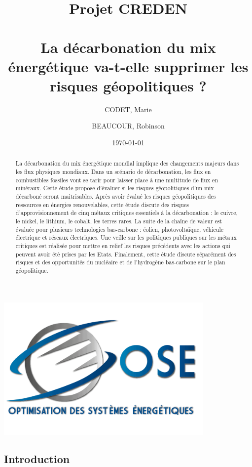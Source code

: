 \documentclass{article}
\title{\centering\huge Projet CREDEN \\~\\ \Large La décarbonation du mix énergétique va-t-elle supprimer les risques géopolitiques ?}
\author{
  CODET, Marie\\
  \and
  BEAUCOUR, Robinson\\
}
\date{\today}
\begin{document}

\maketitle
\begin{center}
    \includegraphics[width=0.8\textwidth]{Images/Intro/PNG-OSE-LOGO-FINAL-1.png}
\end{center}

\begin{abstract}
    La décarbonation du mix énergétique mondial implique des changements majeurs dans les flux physiques mondiaux. Dans un scénario de décarbonation, les flux en combustibles fossiles vont se tarir pour laisser place à une multitude de flux en minéraux. Cette étude propose d'évaluer si les risques géopolitiques d'un mix décarboné seront maîtrisables. Après avoir évalué les risques géopolitiques des ressources en énergies renouvelables, cette étude discute des risques d'approvisionnement de cinq métaux critiques essentiels à la décarbonation : le cuivre, le nickel, le lithium, le cobalt, les terres rares. La suite de la chaîne de valeur est évaluée pour plusieurs technologies bas-carbone : éolien, photovoltaïque, véhicule électrique et réseaux électriques. Une veille sur les politiques publiques sur les métaux critiques est réalisée pour mettre en relief les risques précédents avec les actions qui peuvent avoir été prises par les Etats. Finalement, cette étude discute séparément des risques et des opportunités du nucléaire et de l'hydrogène bas-carbone sur le plan géopolitique.
\end{abstract}

\newpage
\tableofcontents
\clearpage
\listoffigures
\listoftables

\newpage
\begin{refsection}
\section*{Introduction}

\vfill
\printbibliography
\clearpage
\end{refsection}
\end{document}
